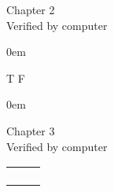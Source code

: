 \documentclass{report}
\begin{document}
\begin{flushleft}
\begin{minipage}{\linewidth}
\begin{minipage}{0.45\textwidth}
\begin{center}
Chapter 2\\
Verified by computer\\
\end{center}
\begin{enumerate}
  \itemsep0em
	
		
\end{enumerate}
\hspace{25pt} T\hspace{3pt} F%
\begin{enumerate}
  \itemsep0em
	
	
		
\end{enumerate}
\end{minipage}
\hfill %
\begin{minipage}{0.45\textwidth}
\begin{center}
Chapter 3\\
Verified by computer\\
\end{center}
\begin{tabular}{|p{\textwidth}}
\begin{enumerate}



\end{enumerate}
\end{tabular}
\end{minipage}
\end{minipage}
\end{flushleft}
\end{document}
